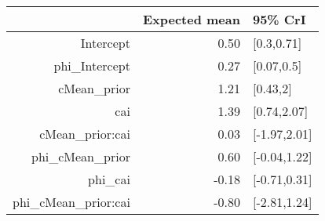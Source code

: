 \begin{tabular}{rrl}
  \hline
 & Expected mean & 95\% CrI \\ 
  \hline
Intercept & 0.50 & [0.3,0.71] \\ 
  phi\_Intercept & 0.27 & [0.07,0.5] \\ 
  cMean\_prior & 1.21 & [0.43,2] \\ 
  cai & 1.39 & [0.74,2.07] \\ 
  cMean\_prior:cai & 0.03 & [-1.97,2.01] \\ 
  phi\_cMean\_prior & 0.60 & [-0.04,1.22] \\ 
  phi\_cai & -0.18 & [-0.71,0.31] \\ 
  phi\_cMean\_prior:cai & -0.80 & [-2.81,1.24] \\ 
   \hline
\end{tabular}

